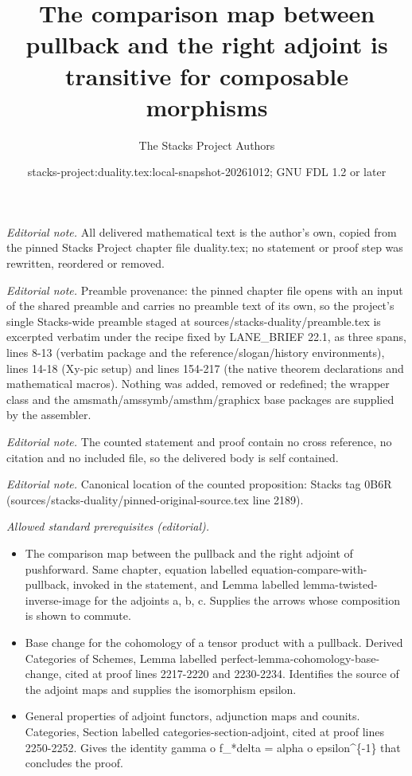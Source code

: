 \documentclass[10pt,a4paper]{amsart}
\title{The comparison map between pullback and the right adjoint is transitive for composable morphisms}
\author{The Stacks Project Authors}
\date{stacks-project:duality.tex:local-snapshot-20261012; GNU FDL 1.2 or later}
\theoremstyle{plain}
\theoremstyle{definition}
\theoremstyle{remark}
\numberwithin{equation}{subsection}
\begin{document}
\maketitle
\noindent\textit{Editorial note.} All delivered mathematical text is the author's own, copied from the pinned Stacks Project chapter file duality.tex; no statement or proof step was rewritten, reordered or removed.\par\medskip
\noindent\textit{Editorial note.} Preamble provenance: the pinned chapter file opens with an input of the shared preamble and carries no preamble text of its own, so the project's single Stacks-wide preamble staged at sources/stacks-duality/preamble.tex is excerpted verbatim under the recipe fixed by LANE\_BRIEF 22.1, as three spans, lines 8-13 (verbatim package and the reference/slogan/history environments), lines 14-18 (Xy-pic setup) and lines 154-217 (the native theorem declarations and mathematical macros). Nothing was added, removed or redefined; the wrapper class and the amsmath/amssymb/amsthm/graphicx base packages are supplied by the assembler.\par\medskip
\noindent\textit{Editorial note.} The counted statement and proof contain no cross reference, no citation and no included file, so the delivered body is self contained.\par\medskip
\noindent\textit{Editorial note.} Canonical location of the counted proposition: Stacks tag 0B6R (sources/stacks-duality/pinned-original-source.tex line 2189).\par\medskip
\noindent\textit{Allowed standard prerequisites (editorial).}\begin{itemize}
\item The comparison map between the pullback and the right adjoint of pushforward. Same chapter, equation labelled equation-compare-with-pullback, invoked in the statement, and Lemma labelled lemma-twisted-inverse-image for the adjoints a, b, c. Supplies the arrows whose composition is shown to commute.
\item Base change for the cohomology of a tensor product with a pullback. Derived Categories of Schemes, Lemma labelled perfect-lemma-cohomology-base-change, cited at proof lines 2217-2220 and 2230-2234. Identifies the source of the adjoint maps and supplies the isomorphism epsilon.
\item General properties of adjoint functors, adjunction maps and counits. Categories, Section labelled categories-section-adjoint, cited at proof lines 2250-2252. Gives the identity gamma o f\_*delta = alpha o epsilon\textasciicircum{}\{-1\} that concludes the proof.
\end{itemize}\medskip
\end{document}
